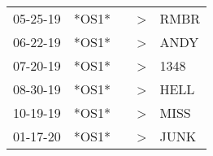 \begin{supertabular}{p{0.07\textwidth}p{0.06\textwidth}p{0.02\textwidth}p{0.02\textwidth}p{0.06\textwidth}}
 05-25-19\textsuperscript{} &  *OS1* &   &  \textgreater &  RMBR\textsuperscript{} \\
 06-22-19\textsuperscript{} &  *OS1* &   &  \textgreater &  ANDY\textsuperscript{} \\
 07-20-19\textsuperscript{} &  *OS1* &   &  \textgreater &  1348\textsuperscript{} \\
 08-30-19\textsuperscript{} &  *OS1* &   &  \textgreater &  HELL\textsuperscript{} \\
 10-19-19\textsuperscript{} &  *OS1* &   &  \textgreater &  MISS\textsuperscript{} \\
 01-17-20\textsuperscript{} &  *OS1* &   &  \textgreater &  JUNK\textsuperscript{} \\
\end{supertabular}
